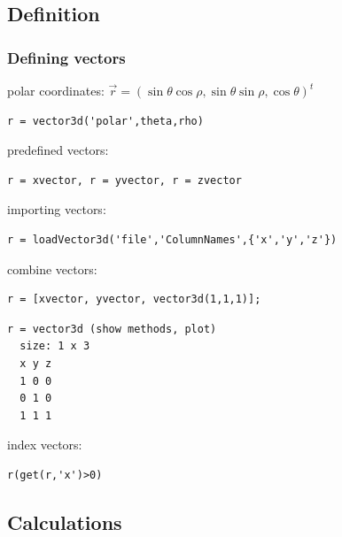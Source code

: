 \subsection*{Definition}

\begin{frame}
  \frametitle{Defining vectors}

  polar coordinates: $\vec r = (\sin \theta \cos \rho,\sin \theta \sin \rho,\cos \theta)^{t}$

\begin{lstlisting}
r = vector3d('polar',theta,rho)
\end{lstlisting}

  \pause \medskip

  predefined vectors:
\begin{lstlisting}
r = xvector, r = yvector, r = zvector
\end{lstlisting}

  \pause \medskip

  importing vectors:
\begin{lstlisting}
r = loadVector3d('file','ColumnNames',{'x','y','z'})
\end{lstlisting}

  \pause \medskip

  combine vectors:
\begin{lstlisting}
r = [xvector, yvector, vector3d(1,1,1)];
\end{lstlisting}
\begin{lstlisting}[style=output]
r = vector3d (show methods, plot)
  size: 1 x 3
  x y z
  1 0 0
  0 1 0
  1 1 1
\end{lstlisting}

\pause \medskip

  index vectors:
\begin{lstlisting}
r(get(r,'x')>0)
\end{lstlisting}

\end{frame}

\subsection*{Calculations}

